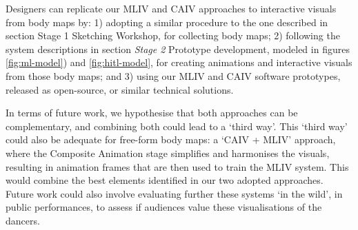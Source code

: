 Designers can replicate our MLIV and CAIV approaches to interactive visuals from body maps by: 1) adopting a similar procedure to the one described in section Stage 1 Sketching Workshop, for collecting body maps; 2) following the system descriptions in section \textit{Stage 2} Prototype development, modeled in figures \ref{fig:ml-model}) and \ref{fig:hitl-model}, for creating animations and interactive visuals from those body maps; and 3) using our MLIV and CAIV software prototypes, released as open-source, or similar technical solutions.

In terms of future work, we hypothesise that both approaches can be complementary, and combining both could lead to a ‘third way’. This ‘third way’ could also be adequate for free-form body maps: a ‘CAIV + MLIV’ approach, where the Composite Animation stage simplifies and harmonises the visuals, resulting in animation frames that are then used to train the MLIV system. This would combine the best elements identified in our two adopted approaches. Future work could also involve evaluating further these systems ‘in the wild’, in public performances, to assess if audiences value these visualisations of the dancers.








